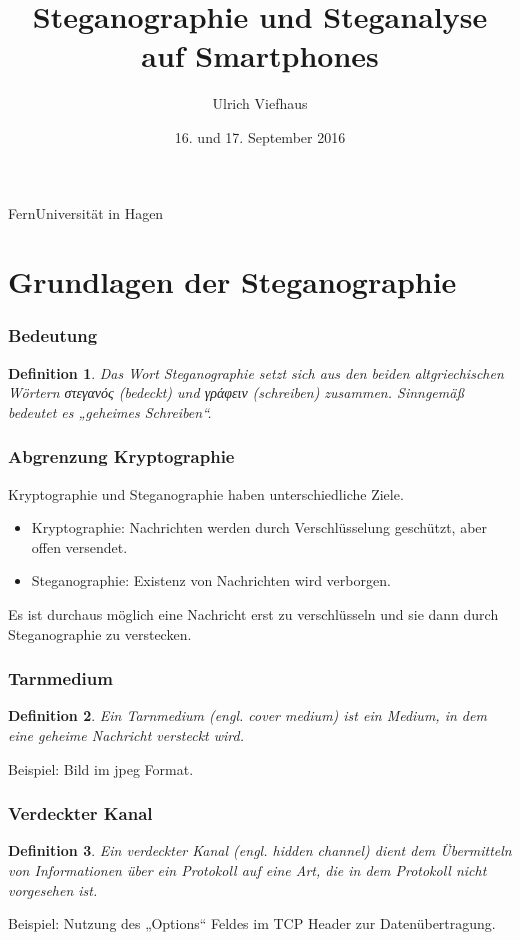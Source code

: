 \documentclass{beamer}
\newtheorem{mydef}{Definition}
\begin{document}
\title{Steganographie und Steganalyse auf Smartphones}
\author{Ulrich Viefhaus}
\institute
{
  FernUniversität in Hagen
}
\date{16. und 17. September 2016}
\subject{Steganographie, Inforation Hiding, Steganalysis}

\frame[allowframebreaks]{\titlepage}

\section{Grundlagen der Steganographie}

\begin{frame}
    \frametitle{Bedeutung}
    \begin{mydef}
    Das Wort Steganographie setzt sich aus den beiden altgriechischen Wörtern \textgreek[variant=ancient]{στεγανός} (bedeckt) und \textgreek[variant=ancient]{γράφειν} (schreiben) zusammen. Sinngemäß bedeutet es „geheimes Schreiben“.
  \end{mydef}
\end{frame}

\begin{frame}
    \frametitle{Abgrenzung Kryptographie}
    Kryptographie und Steganographie haben unterschiedliche Ziele.
	  \begin{itemize}
	    \item Kryptographie: Nachrichten werden durch Verschlüsselung geschützt, aber offen versendet.
	    \item Steganographie: Existenz von Nachrichten wird verborgen.
	  \end{itemize}
	  Es ist durchaus möglich eine Nachricht erst zu verschlüsseln und sie dann durch Steganographie zu verstecken.
\end{frame}

\begin{frame}
  \frametitle{Tarnmedium}
  \begin{mydef}
  Ein Tarnmedium (engl. cover medium) ist ein Medium, in dem eine geheime Nachricht versteckt wird.
  \end{mydef}
  Beispiel: Bild im jpeg Format.
\end{frame}

\begin{frame}
\frametitle{Verdeckter Kanal}
  \begin{mydef}
  Ein verdeckter Kanal (engl. hidden channel) dient dem Übermitteln von Informationen über ein Protokoll auf eine Art, die in dem Protokoll nicht vorgesehen ist.
  \end{mydef}
  Beispiel: Nutzung des „Options“ Feldes im TCP Header zur Datenübertragung.
\end{frame}
  
\end{document}
